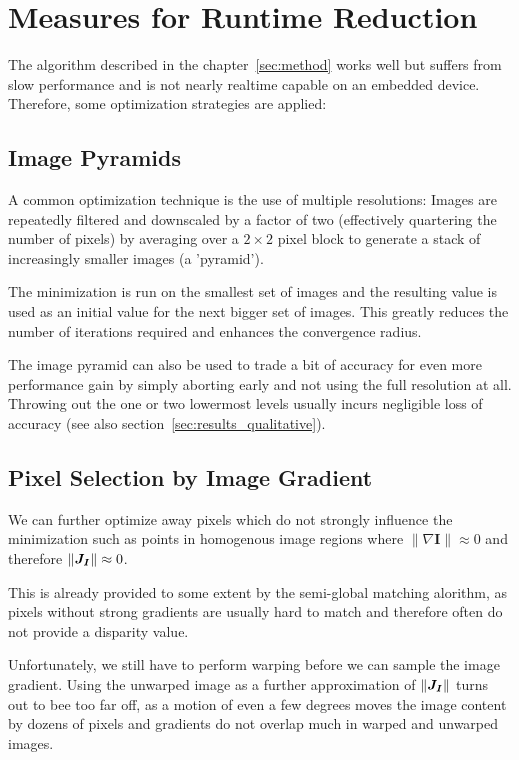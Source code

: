 \section{Measures for Runtime Reduction}
\label{sec:optimizations}

The algorithm described in the chapter~\ref{sec:method} works well but suffers from
slow performance and is not nearly realtime capable on an embedded device.
Therefore, some optimization strategies are applied:

\subsection{Image Pyramids}
\label{sec:pyramids}

A common optimization technique is the use of multiple resolutions: Images are
repeatedly filtered and downscaled by a factor of two (effectively quartering
the number of pixels) by averaging over a $2 \times 2$ pixel block to generate
a stack of increasingly smaller images (a 'pyramid').

The minimization is run on the smallest set of images and the resulting value
is used as an initial value for the next bigger set of images.
This greatly reduces the number of iterations required and enhances the
convergence radius.

The image pyramid can also be used to trade a bit of accuracy for even more
performance gain by simply aborting early and not using the full resolution at
all. Throwing out the one or two lowermost levels usually incurs negligible
loss of accuracy (see also section~\ref{sec:results_qualitative}).


\subsection{Pixel Selection by Image Gradient}
\label{sec:gradient_filtering}

We can further optimize away pixels which do not strongly influence the
minimization such as points in homogenous image regions where $\lVert \nabla
\mathbf{I} \rVert \approx 0$ and therefore $\lVert \mat{J_I} \rVert \approx 0$.

This is already provided to some extent by the semi-global matching alorithm,
as pixels without strong gradients are usually hard to match and therefore often
do not provide a disparity value.

Unfortunately, we still have to perform warping before we can sample the image
gradient. Using the unwarped image as a further approximation of $\lVert
\mat{J_I} \rVert$ turns out to bee too far off, as a motion of even a few
degrees moves the image content by dozens of pixels and gradients do not
overlap much in warped and unwarped images.

